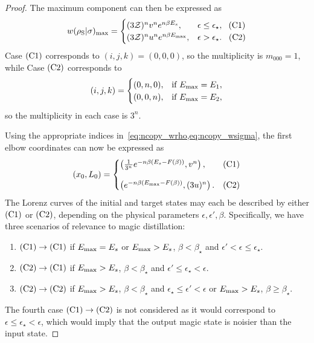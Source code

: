 \documentclass[pra,
aps,
twocolumn,
superscriptaddress,
groupedaddress,
nofootinbib,
reprint
]{revtex4-1}
\begin{document}
\begin{proof}
The maximum component can then be expressed as
\begin{equation}
w(\rho_{\rm{S}} | \sigma)_{\rm{max}} =
	\begin{cases}
		(3\mathcal{Z})^{n} v^n e^{n\beta E_s}, &\epsilon \leq \epsilon_{\star},\ \hspace{3pt}\rm{(C1)}	\\
		(3\mathcal{Z})^{n} u^n e^{n\beta E_{\rm{max}}}, &\epsilon > \epsilon_{\star}.\ \hspace{5pt}\rm{(C2)} 
	\end{cases}
\end{equation}
Case $\rm{(C1)}$ corresponds to $(i,j,k) = (0,0,0)$, so the multiplicity is $m_{000} = 1$, while
Case $\rm{(C2)}$ corresponds to
\begin{equation}
	(i,j,k) = 
	\begin{cases}
	(0,n,0), &\text{if } E_{\rm{max}} = E_1, \\
	(0,0,n), &\text{if } E_{\rm{max}} = E_2,
	\end{cases}
\end{equation}
so the multiplicity in each case is $3^n$.

Using the appropriate indices in~\cref{eq:ncopy_wrho,eq:ncopy_wsigma}, the first elbow coordinates can now be expressed as
\begin{equation}\label{eq:first_elb_coords}
	(x_0, L_0) =
	\begin{cases}
		\left(\frac{1}{3^n} e^{-n\beta (E_s - F(\beta))}, v^n \right), &\rm{(C1)}	\vspace{10pt}\\
		\left( e^{-n\beta (E_{\rm{max}}-F(\beta))}, (3u)^n \right). &\rm{(C2)} 
	\end{cases}
\end{equation}
The Lorenz curves of the initial and target states may each be described by either $\rm{(C1)}$ or $\rm{(C2)}$, depending on the physical parameters $\epsilon, \epsilon', \beta$.
Specifically, we have three scenarios of relevance to magic distillation:
\begin{enumerate}
	\item $\rm{(C1)} \rightarrow \rm{(C1)}$ if $E_{\rm{max}} = E_s$ or $E_{\rm{max}} > E_s$, $\beta < \beta_{\star}$ and $\epsilon' < \epsilon  \leq \epsilon_{\star}$.
	\item $\rm{(C2)} \rightarrow \rm{(C1)}$ if $E_{\rm{max}} > E_s$, $\beta < \beta_{\star}$ and $\epsilon' \leq \epsilon_{\star} < \epsilon$.
	\item $\rm{(C2)} \rightarrow \rm{(C2)}$ if $E_{\rm{max}} > E_s$, $\beta < \beta_{\star}$ and $\epsilon_{\star} \leq \epsilon' < \epsilon$ or $E_{\rm{max}} > E_s$, $\beta \geq \beta_{\star}$.
\end{enumerate}
The fourth case $\rm{(C1)} \rightarrow \rm{(C2)}$ is not considered as it would correspond to $\epsilon \leq \epsilon_\star < \epsilon$, which would imply that the output magic state is noisier than the input state.


\end{proof}
\end{document}

